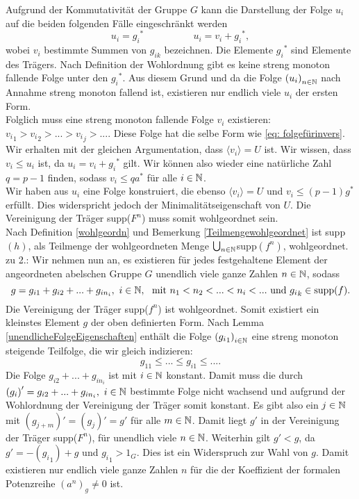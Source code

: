 {%
%
Aufgrund der Kommutativität der Gruppe $G$ kann die Darstellung der Folge $u_i$ auf die beiden folgenden Fälle eingeschränkt werden
%
%
%
%
% 
%
\[
u_i = {g_i}^* ~~~~~~~~~~~~~~~~~~~~~~~       u_i = v_i+{g_i}^*,
\]
wobei $v_i$ bestimmte Summen von $g_{ik}$ bezeichnen. 
Die Elemente ${g_i}^*$ sind Elemente des Trägers. Nach Definition der Wohlordnung gibt es keine streng monoton fallende Folge unter den ${g_i}^*$. Aus diesem Grund und da die Folge ${\left(u_i\right)}_{n\in \mathbb{N}}$ nach Annahme streng monoton fallend ist, existieren nur endlich viele $u_i$ der ersten Form. \\
Folglich muss eine streng monoton fallende Folge $v_i$ existieren: ${v_i}_1 > {v_i}_2 > ... > {v_i}_j > ...$. Diese Folge hat die selbe Form wie \ref{eq: folgefürinvers}. Wir erhalten mit der gleichen Argumentation, dass $\langle v_i\rangle = U$ ist. Wir wissen, dass $v_i \le u_i$ ist, da $u_i = v_i+{g_i}^*$ gilt. Wir können also wieder eine natürliche Zahl $q = p-1$ finden, sodass $v_i \le qa^*$ für alle $i \in \mathbb{N}$. \\ 
Wir haben aus $u_i$ eine Folge konstruiert, die ebenso $\langle v_i\rangle = U$ und $v_i \leq \left(p-1\right)g^*$ erfüllt.
Dies widerspricht jedoch der Minimalitätseigenschaft von $U$. 
%
%
Die Vereinigung der Träger supp($F^n$) muss somit wohlgeordnet sein. \\
%
%
%
%
Nach Definition \ref{wohlgeordn} und Bemerkung \ref{Teilmengewohlgeordnet} ist supp$(h)$, als Teilmenge der wohlgeordneten Menge $\bigcup_{n\in\mathbb{N}}$supp$(f^n)$, wohlgeordnet.\\
%
%
%
%
%
%
zu 2.: Wir nehmen nun an, es existieren für jedes festgehaltene Element der angeordneten abelschen Gruppe $G$ unendlich viele ganze Zahlen $n \in \mathbb{N}$, sodass \[g = g_{i1} +g_{i2} + ... + g_{in_i},~ i \in \mathbb{N},~\text{ mit } n_1 < n_2 < ... < n_i < ...\text{ und } {g_i}_k \in \text{supp}(f).\]
Die Vereinigung der Träger supp($f^n$) ist wohlgeordnet. Somit existiert ein kleinstes Element $g$ der oben definierten Form. Nach Lemma \ref{unendlicheFolgeEigenschaften} enthält die Folge $\left({g_i}_1\right)_{i\in \mathbb{N}}$ eine streng monoton steigende Teilfolge, die wir gleich indizieren:
\[g_{11} \le ... \le g_{i1} \le ... . \] 
Die Folge $g_{i2} + ... + g_{in_i}$ ist mit $i \in \mathbb{N}$ konstant. Damit muss die durch $\left(g_i\right)'  = g_{i2} + ... + g_{in_i},~ i \in \mathbb{N}$ bestimmte Folge nicht wachsend und aufgrund der Wohlordnung der Vereinigung der Träger somit konstant. Es gibt also ein $j \in \mathbb{N}$ mit $\left(g_{j+m}\right)' = \left(g_j\right)' = g'$ für alle $m \in \mathbb{N}$. Damit liegt $g'$ in der Vereinigung der Träger supp($F^n$), für unendlich viele $n\in \mathbb{N}$. Weiterhin gilt $g' < g$, da $g' = -\left({g_i}_1\right) + g$ und ${g_i}_1 >1_G$. Dies ist ein Widerspruch zur Wahl von $g$. Damit existieren nur endlich viele ganze Zahlen $n$ für die der Koeffizient der formalen Potenzreihe $\left(a^n\right)_g \neq 0$ ist.
}
